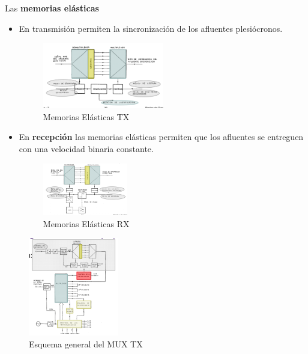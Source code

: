 \documentclass[10pt,portrait, twocolumn]{article}
\begin{document}
Las \textbf{memorias elásticas} 

\begin{itemize}
\item En transmisión permiten la sincronización de los afluentes plesiócronos.

\begin{figure}[!ht]
	\centering
     \includegraphics[width=0.5\textwidth]{Elastica}
      \caption{Memorias Elásticas TX}
      \label{fig:Regiones de frecuencias}
  \end{figure}

\item En \textbf{recepción} las memorias elásticas permiten que los afluentes se entreguen con una velocidad binaria constante.

\begin{figure}[!ht]
	\centering
     \includegraphics[width=0.35\textwidth]{Elastica2}
      \caption{Memorias Elásticas RX}
      \label{fig:Regiones de frecuencias}
  \end{figure}
\end{itemize}
  
 
\begin{figure}[!ht]
	\centering
     \includegraphics[width=0.35\textwidth]{muxtx}
      \caption{Esquema general del MUX TX}
      \label{fig:Regiones de frecuencias}
\end{figure}
\end{document}
